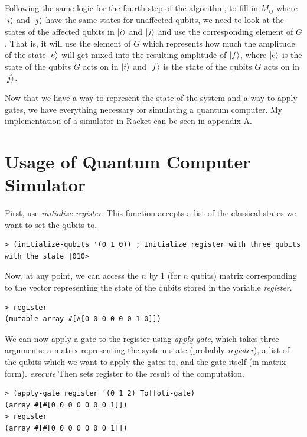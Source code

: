 \documentclass[11pt]{report}
\newcommand{\?}{\stackrel{?}{=}}
\begin{document}
Following the same logic for the fourth step of the algorithm, to fill in $M_{ij}$ where $\ket{i}$ and $\ket{j}$ have the same states for unaffected qubits, we need to look at the states of the affected qubits in $\ket{i}$ and $\ket{j}$ and use the corresponding element of $G$. That is, it will use the element of $G$ which represents how much the amplitude of the state $\ket{e}$ will get mixed into the resulting amplitude of $\ket{f}$, where $\ket{e}$ is the state of the qubits $G$ acts on in $\ket{i}$ and $\ket{f}$ is the state of the qubits $G$ acts on in $\ket{j}$.

Now that we have a way to represent the state of the system and a way to apply gates, we have everything necessary for simulating a quantum computer. My implementation of a simulator in Racket can be seen in appendix A.

\section{Usage of Quantum Computer Simulator}

First, use \textit{initialize-register}. This function accepts a list of the classical states we want to set the qubits to.

\begin{verbatim}
> (initialize-qubits '(0 1 0)) ; Initialize register with three qubits with the state |010>
\end{verbatim}

Now, at any point, we can access the $n$ by 1 (for $n$ qubits) matrix corresponding to the vector representing the state of the qubits stored in the variable \textit{register}.

\begin{verbatim}
> register
(mutable-array #[#[0 0 0 0 0 0 1 0]])
\end{verbatim}

We can now apply a gate to the register using \textit{apply-gate}, which takes three arguments: a matrix representing the system-state (probably \textit{register}), a list of the qubits which we want to apply the gates to, and the gate itself (in matrix form). \textit{execute} Then sets register to the result of the computation.

\begin{verbatim}
> (apply-gate register '(0 1 2) Toffoli-gate)
(array #[#[0 0 0 0 0 0 0 1]])
> register
(array #[#[0 0 0 0 0 0 0 1]])
\end{verbatim}
\end{document}
